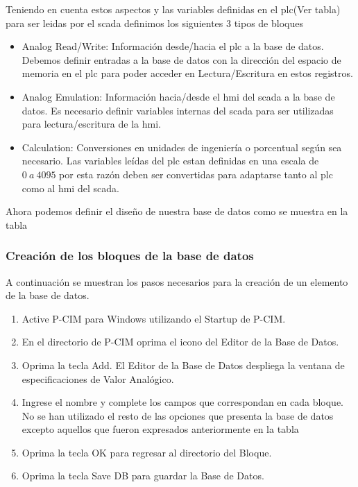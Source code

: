 Teniendo en cuenta estos aspectos y las variables definidas en el \gls{plc}(Ver tabla) 
para ser leidas por el \gls{scada} definimos los siguientes 3 tipos de bloques
\begin{itemize}
 \item Analog Read/Write: Información desde/hacia el \gls{plc} a la base de datos. Debemos definir entradas
 a la base de datos con la dirección del espacio de memoria en el \gls{plc} para poder acceder en Lectura/Escritura
 en estos registros.
 \item Analog Emulation: Información hacia/desde el \gls{hmi} del \gls{scada} a la base de datos. Es necesario 
 definir variables internas del \gls{scada} para ser utilizadas para lectura/escritura de la \gls{hmi}.
 \item Calculation:  Conversiones en unidades de ingeniería o porcentual según sea necesario. 
 Las variables leídas del \gls{plc} estan definidas en una escala de $0~a~4095$ por esta razón deben ser
 convertidas para adaptarse tanto al \gls{plc} como al \gls{hmi} del \gls{scada}.
\end{itemize}
Ahora podemos definir el diseño de nuestra base de datos como se muestra en la tabla

%


\subsubsection{Creación de los bloques de la base de datos}

A continuación se muestran los pasos necesarios para la creación de un elemento de la base de datos.
\begin{enumerate}
 \item Active P-CIM para Windows utilizando el Startup de P-CIM.
 \item En el directorio de P-CIM oprima el icono del Editor de la Base de Datos.
 \item Oprima la tecla Add. El Editor de la Base de Datos despliega la ventana de
  especificaciones de Valor Analógico.
 \item  Ingrese el nombre y complete los campos que correspondan en cada bloque. No se han utilizado
 el resto de las opciones que presenta la base de datos excepto aquellos que fueron expresados anteriormente 
 en la tabla 
 \item Oprima la tecla OK para regresar al directorio del Bloque.
 \item Oprima la tecla Save DB para guardar la Base de Datos.
\end{enumerate}

